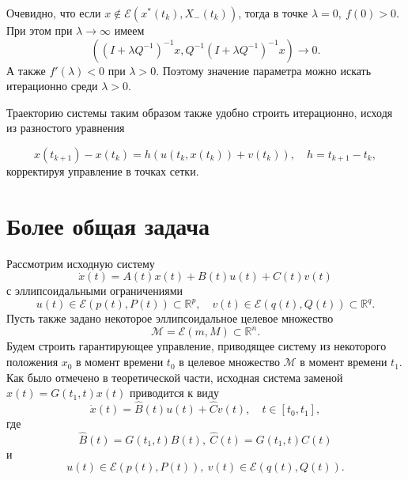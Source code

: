 Очевидно, что если \( x \notin \mathcal{E}(x^*(t_k), X_-(t_k)) \), тогда в точке \( \lambda = 0, \ f(0) > 0 \).
При этом при \( \lambda \to \infty \) имеем
\begin{equation}
    ((I + \lambda Q^{-1})^{-1}x, Q^{-1}(I + \lambda Q^{-1})^{-1}x ) \to 0.
\end{equation}
А также \( f'(\lambda) < 0 \) при  \( \lambda > 0. \) Поэтому значение параметра можно искать итерационно среди 
 \( \lambda > 0 \). 

Траекторию системы таким образом также удобно строить итерационно, исходя из разностого уравнения

\begin{equation*}
    x(t_{k+1}) - x(t_k) = h(u(t_k, x(t_k)) + v(t_k)), \quad h = t_{k+1} - t_k,
\end{equation*}
корректируя управление в точках сетки.

\section{Более общая задача}

Рассмотрим исходную систему
\begin{equation*}
    \dot{x}(t) = A(t) x(t) + B(t) u(t) + C(t) v(t)
\end{equation*}
с эллипсоидальными ограничениями
\begin{equation*}
    u(t) \in \mathcal{E}(p(t), P(t)) \subset \mathbb{R}^p, \quad v(t) \in \mathcal{E}(q(t), Q(t)) \subset \mathbb{R}^q.
\end{equation*}
Пусть также задано некоторое эллипсоидальное целевое множество
\begin{equation*}
    \mathcal{M} = \mathcal{E}(m, M) \subset \mathbb{R}^n.
\end{equation*}
Будем строить гарантирующее управление, приводящее систему из некоторого положения 
\( x_0 \) в момент времени \( t_0 \) в целевое множество \( \mathcal{M} \) в момент времени \( t_1 \). Как было отмечено в теоретической части,
 исходная система заменой \( x(t) = G(t_1, t) x(t) \) приводится к виду
\begin{equation*}
    \dot{x}(t) = \hat{B}(t)u(t) + \hat{C}v(t), \quad t \in [t_0, t_1],
\end{equation*}
где 
\begin{equation*}
    \hat{B}(t) = G(t_1, t)B(t), \ \hat{C}(t) = G(t_1, t) C(t)
\end{equation*}
и
\begin{equation*}
    u(t) \in \mathcal{E}(p(t), P(t)), \ v(t) \in \mathcal{E}(q(t), Q(t)).
\end{equation*}

